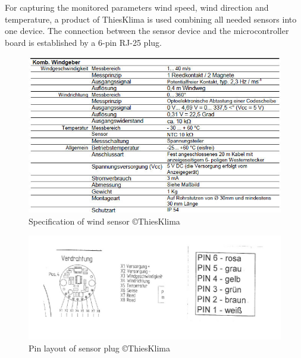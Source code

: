 For capturing the monitored parameters wind speed, wind direction and temperature, a product of ThiesKlima is used combining all needed sensors into one device. The connection between the sensor device and the microcontroller board is established by a 6-pin RJ-25 plug.

\begin{figure}[ht]
    \centering
    \includegraphics[width=0.9\linewidth]{graphics/windsensor_specs.jpg}
    \caption{Specification of wind sensor \copyright ThiesKlima}
    \label{fig:windsensor_spec}
\end{figure}
	
\begin{figure}[ht]
    \centering
    \includegraphics[width=0.8\linewidth]{graphics/windsensor_pinlayout.jpg}
    \caption{Pin layout of sensor plug \copyright ThiesKlima}
    \label{fig:windsensor_pinlayout}
\end{figure}

\newpage